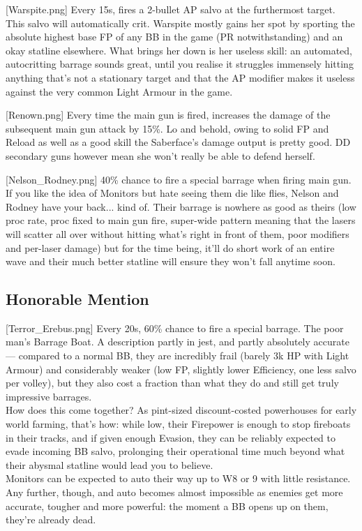[Warspite.png]
{Every 15s, fires a 2-bullet AP salvo at the furthermost target. This salvo will automatically crit.}
{}
{Warspite mostly gains her spot by sporting the absolute highest base FP of any BB in the game (PR notwithstanding) and an okay statline elsewhere. What brings her down is her useless skill: an automated, autocritting barrage sounds great, until you realise it struggles immensely hitting anything that's not a stationary target and that the AP modifier makes it useless against the very common Light Armour in the game.}
 
[Renown.png]
{Every time the main gun is fired, increases the damage of the subsequent main gun attack by 15\%. }
{}
{Lo and behold, owing to solid FP and Reload as well as a good skill the Saberface's damage output is pretty good. DD secondary guns however mean she won't really be able to defend herself.}

[Nelson_Rodney.png]
{40\% chance to fire a special barrage when firing main gun.}
{}
{If you like the idea of Monitors but hate seeing them die like flies, Nelson and Rodney have your back... kind of. Their barrage is nowhere as good as theirs (low proc rate, proc fixed to main gun fire, super-wide pattern meaning that the lasers will scatter all over without hitting what's right in front of them, poor modifiers and per-laser damage) but for the time being, it'll do short work of an entire wave and their much better statline will ensure they won't fall anytime soon.}


\newpage
\subsection{Honorable Mention}
[Terror_Erebus.png]
{Every 20s, 60\% chance to fire a special barrage.}
{The poor man's Barrage Boat.}
{A description partly in jest, and partly absolutely accurate --- compared to a normal BB, they are incredibly frail (barely 3k HP with Light Armour) and considerably weaker (low FP, slightly lower Efficiency, one less salvo per volley), but they also cost a fraction than what they do and still get truly impressive barrages.\\
How does this come together? As pint-sized discount-costed powerhouses for early world farming, that's how: while low, their Firepower is enough to stop fireboats in their tracks, and if given enough Evasion, they can be reliably expected to evade incoming BB salvo, prolonging their operational time much beyond what their abysmal statline would lead you to believe.\\
Monitors can be expected to auto their way up to W8 or 9 with little resistance. Any further, though, and auto becomes almost impossible as enemies get more accurate, tougher and more powerful: the moment a BB opens up on them, they're already dead.}
 

